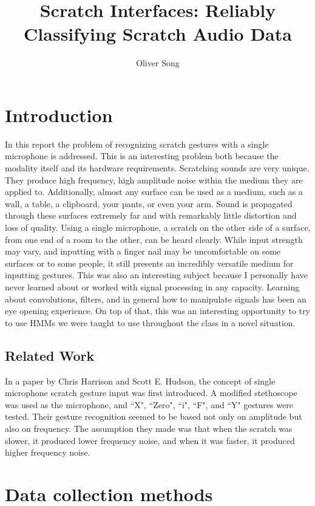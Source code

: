 \documentclass[12pt]{article}
\title{Scratch Interfaces: Reliably Classifying Scratch Audio Data}
\author{Oliver Song}
\begin{document}
\maketitle

\section{Introduction}

In this report the problem of recognizing scratch gestures with a single microphone is addressed. This is an interesting problem both because the modality itself and its hardware requirements. Scratching sounds are very unique. They produce high frequency, high amplitude noise within the medium they are applied to. Additionally, almost any surface can be used as a medium, such as a wall, a table, a clipboard, your pants, or even your arm. Sound is propagated through these surfaces extremely far and with remarkably little distortion and loss of quality. Using a single microphone, a scratch on the other side of a surface, from one end of a room to the other, can be heard clearly. While input strength may vary, and inputting with a finger nail may be uncomfortable on some surfaces or to some people, it still presents an incredibly versatile medium for inputting gestures. This was also an interesting subject because I personally have never learned about or worked with signal processing in any capacity. Learning about convolutions, filters, and in general how to manipulate signals has been an eye opening experience. On top of that, this was an interesting opportunity to try to use HMMs we were taught to use throughout the class in a novel situation.

\subsection{Related Work}

In a paper by Chris Harrison and Scott E. Hudson, the concept of single microphone scratch gesture input was first introduced. A modified stethoscope was used as the microphone, and ``X", ``Zero", ``i", ``F", and ``Y" gestures were tested. Their gesture recognition seemed to be based not only on amplitude but also on frequency. The assumption they made was that when the scratch was slower, it produced lower frequency noise, and when it was faster, it produced higher frequency noise.

\section{Data collection methods}
\end{document}
